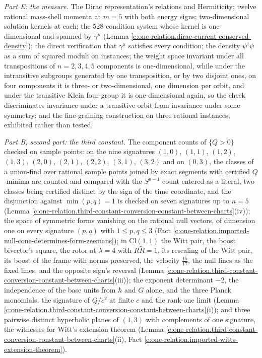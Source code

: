 \documentclass[11pt]{article}
\theoremstyle{definition}
\theoremstyle{plain}
\providecommand{\Cl}{}\renewcommand{\Cl}{\mathrm{Cl}}
\begin{document}
\emph{Part E: the measure.} The Dirac representation's relations and Hermiticity; twelve rational mass-shell momenta at $m = 5$ with both energy signs; two-dimensional solution kernels at each; the $528$-condition system whose kernel is one-dimensional and spanned by $\gamma^{\mu}$ (Lemma \ref{c:one-relation.dirac-current-conserved-density}); the direct verification that $\gamma^{\mu}$ satisfies every condition; the density $\psi^{\dagger}\psi$ as a sum of squared moduli on instances; the weight space invariant under all transpositions of $n = 2, 3, 4, 5$ components is one-dimensional, while under the intransitive subgroups generated by one transposition, or by two disjoint ones, on four components it is three- or two-dimensional, one dimension per orbit, and under the transitive Klein four-group it is one-dimensional again, so the check discriminates invariance under a transitive orbit from invariance under some symmetry; and the fine-graining construction on three rational instances, exhibited rather than tested.

\emph{Part B, second part: the third constant.} The component counts of $\{Q > 0\}$ checked on sample points: on the nine signatures $(1,0)$, $(1,1)$, $(1,2)$, $(1,3)$, $(2,0)$, $(2,1)$, $(2,2)$, $(3,1)$, $(3,2)$ and on $(0,3)$, the classes of a union-find over rational sample points joined by exact segments with certified $Q$-minima are counted and compared with the $S^{p-1}$ count entered as a literal, two classes being certified distinct by the sign of the time coordinate, and the disjunction against $\min(p,q) = 1$ is checked on seven signatures up to $n = 5$ (Lemma \ref{c:one-relation.third-constant-conversion-constant-between-charts}(iv)); the space of symmetric forms vanishing on the rational null vectors, of dimension one on every signature $(p,q)$ with $1 \leq p, q \leq 3$ (Fact \ref{c:one-relation.imported-null-cone-determines-form-zeemans}); in $\Cl(1,1)$ the Witt pair, the boost bivector's square, the rotor at $\lambda = 4$ with $R\tilde{R} = 1$, its rescaling of the Witt pair, its boost of the frame with norms preserved, the velocity $\tfrac{15}{17}$, the null lines as the fixed lines, and the opposite sign's reversal (Lemma \ref{c:one-relation.third-constant-conversion-constant-between-charts}(iii)); the exponent determinant $-2$, the independence of the base units from $\hbar$ and $G$ alone, and the three Planck monomials; the signature of $Q/c^{2}$ at finite $c$ and the rank-one limit (Lemma \ref{c:one-relation.third-constant-conversion-constant-between-charts}(i)); and three pairwise distinct hyperbolic planes of $(1,3)$ with complements of one signature, the witnesses for Witt's extension theorem (Lemma \ref{c:one-relation.third-constant-conversion-constant-between-charts}(ii), Fact \ref{c:one-relation.imported-witts-extension-theorem}).
\end{document}
